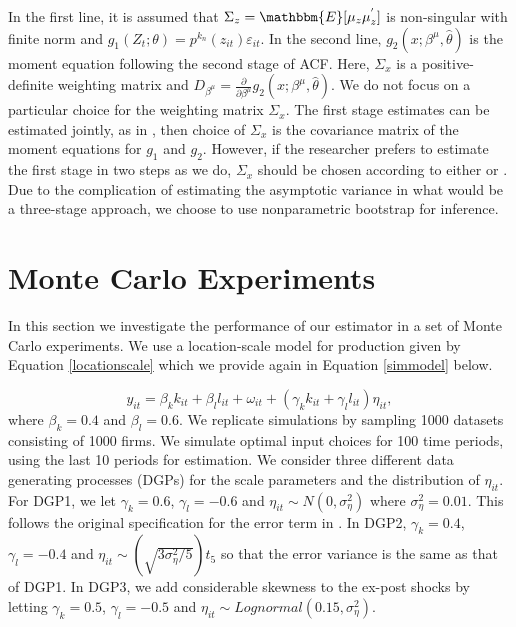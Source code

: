 \documentclass[11pt]{article}
\begin{document}
In the first line, it is assumed that $\Sigma_{z}=\mathbbm{E}[\mu_{z}\mu_{z}^{'}]$ is non-singular with finite norm and $g_{1}(Z_{t};\theta)=p^{k_{n}}(z_{it})\varepsilon_{it}$. In the second line, $g_{2}(x; \beta^{\mu}, \hat{\theta})$ is the moment equation following the second stage of ACF. Here, $\Sigma_{x}$ is a positive-definite weighting matrix and $D_{\beta^{\mu}}=\frac{\partial}{\partial \beta^{\mu}}g_{2}(x; \beta^{\mu}, \hat{\theta})$. We do not focus on a particular choice for the weighting matrix $\Sigma_{x}$. The first stage estimates can be estimated jointly, as in \cite{Wooldridge2009}, then choice of $\Sigma_{x}$ is the covariance matrix of the moment equations for $g_{1}$ and $g_{2}$. However, if the researcher prefers to estimate the first stage in two steps as we do, $\Sigma_{x}$ should be chosen according to either \cite{Ai2012} or \cite{Ackerberg2014}. Due to the complication of estimating the asymptotic variance in what would be a three-stage approach, we choose to use nonparametric bootstrap for inference.
\section{Monte Carlo Experiments} \label{montecarlo}
In this section we investigate the performance of our estimator in a set of Monte Carlo experiments. We use a location-scale model for production given by Equation \eqref{locationscale} which we provide again in Equation \eqref{simmodel} below.

\begin{equation} \label{simmodel}
y_{it}=\beta_{k}k_{it}+\beta_{l}l_{it}+\omega_{it}+(\gamma_{k}k_{it}+\gamma_{l}l_{it})\eta_{it},
\end{equation}
where $\beta_{k}=0.4$ and $\beta_{l}=0.6$. We replicate \cite{Ackerberg2015} simulations by sampling 1000 datasets consisting of 1000 firms. We simulate optimal input choices for 100 time periods, using the last 10 periods for estimation. We consider three different data generating processes (DGPs) for the scale parameters and the distribution of $\eta_{it}$. For DGP1, we let $\gamma_{k}=0.6$, $\gamma_{l}=-0.6$ and $\eta_{it}\sim N(0,\sigma_{\eta}^{2})$ where $\sigma_{\eta}^{2}=0.01$. This follows the original specification for the error term in \cite{Ackerberg2015}. In DGP2, $\gamma_{k}=0.4$, $\gamma_{l}=-0.4$ and $\eta_{it}\sim (\sqrt{3\sigma_{\eta}^{2}/5})t_{5}$ so that the error variance is the same as that of DGP1. In DGP3, we add considerable skewness to the ex-post shocks by letting $\gamma_{k}=0.5$, $\gamma_{l}=-0.5$ and $\eta_{it}\sim Lognormal(0.15,\sigma_{\eta}^{2})$. 
\end{document}
